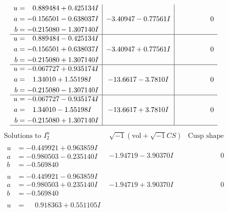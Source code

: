 \documentclass[1p]{elsarticle_modified}
\theoremstyle{definition}
\newcommand{\I}{\sqrt{-1}}
\begin{document}
$$\begin{array}{c|c|c}
\begin{aligned}
u &= \phantom{-}0.889484 + 0.425134 I \\
a &= -0.156501 - 0.638037 I \\
b &= -0.215080 - 1.307140 I\end{aligned}
 & -3.40947 - 0.77561 I & \phantom{-0.000000 } 0 \\ \hline\begin{aligned}
u &= \phantom{-}0.889484 - 0.425134 I \\
a &= -0.156501 + 0.638037 I \\
b &= -0.215080 + 1.307140 I\end{aligned}
 & -3.40947 + 0.77561 I & \phantom{-0.000000 } 0 \\ \hline\begin{aligned}
u &= -0.067727 + 0.935174 I \\
a &= \phantom{-}1.34010 + 1.55198 I \\
b &= -0.215080 - 1.307140 I\end{aligned}
 & -13.6617 - 3.7810 I & \phantom{-0.000000 } 0 \\ \hline\begin{aligned}
u &= -0.067727 - 0.935174 I \\
a &= \phantom{-}1.34010 - 1.55198 I \\
b &= -0.215080 + 1.307140 I\end{aligned}
 & -13.6617 + 3.7810 I & \phantom{-0.000000 } 0\\
 \hline 
 \end{array}$$\newpage$$\begin{array}{c|c|c}  
\text{Solutions to }I^u_{2}& \I (\text{vol} + \sqrt{-1}CS) & \text{Cusp shape}\\
 \hline 
\begin{aligned}
u &= -0.449921 + 0.963859 I \\
a &= -0.980503 - 0.235140 I \\
b &= -0.569840\phantom{ +0.000000I}\end{aligned}
 & -1.94719 - 3.90370 I & \phantom{-0.000000 } 0 \\ \hline\begin{aligned}
u &= -0.449921 - 0.963859 I \\
a &= -0.980503 + 0.235140 I \\
b &= -0.569840\phantom{ +0.000000I}\end{aligned}
 & -1.94719 + 3.90370 I & \phantom{-0.000000 } 0 \\ \hline\begin{aligned}
u &= \phantom{-}0.918363 + 0.551105 I \\

\end{aligned}
\end{array}$$
\end{document}
